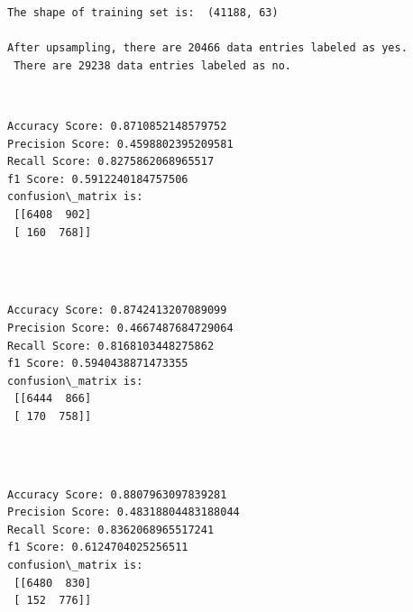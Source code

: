 \documentclass[11pt]{article}
\begin{document}
    \begin{Verbatim}[commandchars=\\\{\}]
The shape of training set is:  (41188, 63) 

After upsampling, there are 20466 data entries labeled as yes.
 There are 29238 data entries labeled as no.

    \end{Verbatim}

    \begin{center}
    \end{center}
    { \hspace*{\fill} \\}
    
    \begin{Verbatim}[commandchars=\\\{\}]
Accuracy Score: 0.8710852148579752
Precision Score: 0.4598802395209581
Recall Score: 0.8275862068965517
f1 Score: 0.5912240184757506
confusion\_matrix is: 
 [[6408  902]
 [ 160  768]] 


    \end{Verbatim}

 

    \begin{center}
    \end{center}
    { \hspace*{\fill} \\}
    
    \begin{Verbatim}[commandchars=\\\{\}]
Accuracy Score: 0.8742413207089099
Precision Score: 0.4667487684729064
Recall Score: 0.8168103448275862
f1 Score: 0.5940438871473355
confusion\_matrix is: 
 [[6444  866]
 [ 170  758]] 


    \end{Verbatim}

   

    \begin{center}
    \end{center}
    { \hspace*{\fill} \\}
    
    \begin{Verbatim}[commandchars=\\\{\}]
Accuracy Score: 0.8807963097839281
Precision Score: 0.48318804483188044
Recall Score: 0.8362068965517241
f1 Score: 0.6124704025256511
confusion\_matrix is: 
 [[6480  830]
 [ 152  776]] 


    \end{Verbatim}
\end{document}
